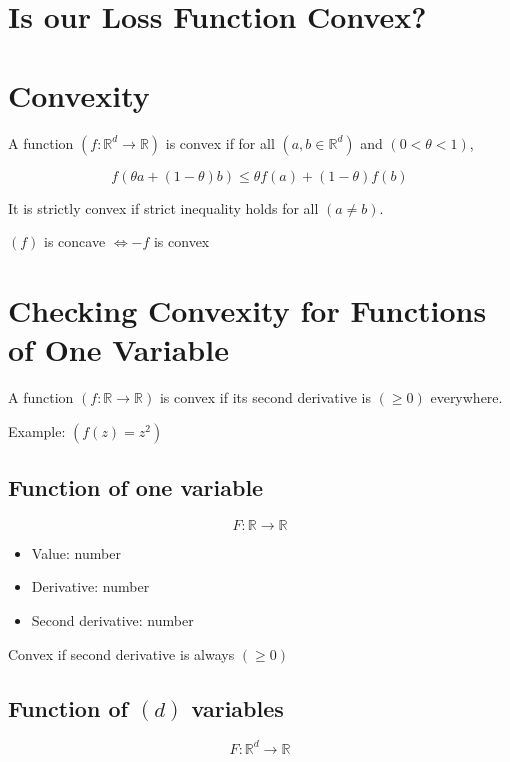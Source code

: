 \documentclass{article}
\begin{document}
\section*{Is our Loss Function Convex?}

\section*{Convexity}
A function $( f: \mathbb{R}^{d} \rightarrow \mathbb{R} )$ is convex if for all $( a, b \in \mathbb{R}^{d} )$ and $( 0 < \theta < 1 )$,

\begin{equation}
f(\theta a + (1 - \theta) b) \leq \theta f(a) + (1 - \theta) f(b)
\end{equation}

It is strictly convex if strict inequality holds for all $( a \neq b )$.

$( f )$ is concave $\Leftrightarrow -f$ is convex

\section*{Checking Convexity for Functions of One Variable}
A function $( f: \mathbb{R} \rightarrow \mathbb{R} )$ is convex if its second derivative is $(\geq 0)$ everywhere.

Example: $( f(z) = z^{2} )$

\subsection*{Function of one variable}
\begin{equation}
F: \mathbb{R} \rightarrow \mathbb{R}
\end{equation}

\begin{itemize}
    \item Value: number
    \item Derivative: number
    \item Second derivative: number
\end{itemize}

Convex if second derivative is always $(\geq 0)$

\subsection*{Function of $( d )$ variables}
\begin{equation}
F: \mathbb{R}^{d} \rightarrow \mathbb{R}
\end{equation}
\end{document}

